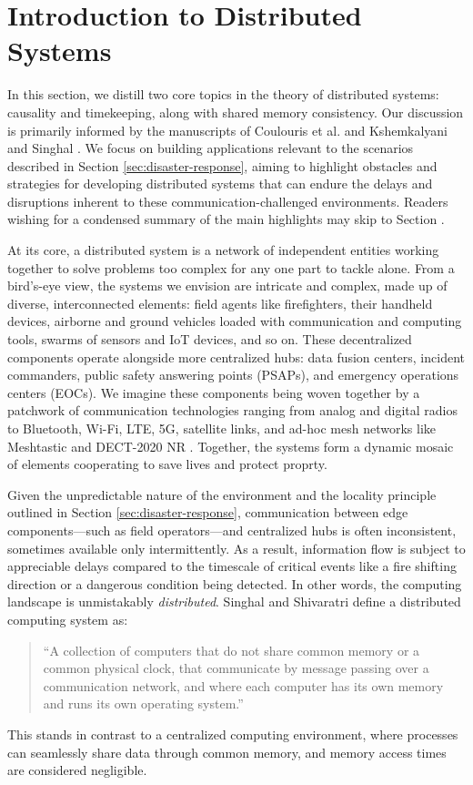 \documentclass[]             %
{NASA}                       %
\theoremstyle{definition}
\begin{document}
\section{Introduction to Distributed Systems}
\label{sec:background}
In this section, we distill two core topics in the theory of
distributed systems: causality and timekeeping, along with shared
memory consistency.  Our discussion is primarily informed by the
manuscripts of Coulouris et al.  \cite{coulouris2005distributed} and
Kshemkalyani and Singhal \cite{kshemkalyani_singhal_2008}. We focus on
building applications relevant to the scenarios described in Section
\ref{sec:disaster-response}, aiming to highlight obstacles and
strategies for developing distributed systems that can endure the
delays and disruptions inherent to these communication-challenged
environments. Readers wishing for a condensed summary of the main
highlights may skip to Section \label{ssec:background-summary}.

At its core, a distributed system is a network of independent entities
working together to solve problems too complex for any one part to
tackle alone. From a bird’s-eye view, the systems we envision are
intricate and complex, made up of diverse, interconnected elements:
field agents like firefighters, their handheld devices, airborne and
ground vehicles loaded with communication and computing tools, swarms
of sensors and IoT devices, and so on. These decentralized components
operate alongside more centralized hubs: data fusion centers, incident
commanders, public safety answering points (PSAPs), and emergency
operations centers (EOCs). We imagine these components being woven
together by a patchwork of communication technologies ranging from
analog and digital radios to Bluetooth, Wi-Fi, LTE, 5G, satellite
links, and ad-hoc mesh networks like Meshtastic \citationneeded and
DECT-2020 NR \citationneeded. Together, the systems form a dynamic
mosaic of elements cooperating to save lives and protect proprty.

Given the unpredictable nature of the environment and the locality
principle outlined in Section \ref{sec:disaster-response},
communication between edge components---such as field operators---and
centralized hubs is often inconsistent, sometimes available only
intermittently. As a result, information flow is subject to
appreciable delays compared to the timescale of critical events like a
fire shifting direction or a dangerous condition being detected. In
other words, the computing landscape is unmistakably
\emph{distributed}. Singhal and Shivaratri \cite{10.5555/562065}
define a distributed computing system as:
\begin{quote}
  ``A collection of computers that do not share common
  memory or a common physical clock, that communicate by message
  passing over a communication network, and where each computer has
  its own memory and runs its own operating system.''
\end{quote}
This stands in contrast to a centralized computing environment, where
processes can seamlessly share data through common memory, and memory
access times are considered negligible.
\end{document}
